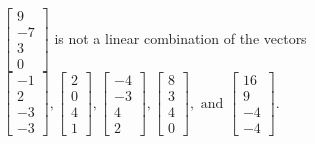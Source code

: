 \begin{exercise}
\begin{exerciseStatement}
  \end{exerciseStatement}
  \begin{exerciseAnswer}
   \(\left[\begin{array}{c}
9 \\
-7 \\
3 \\
0
\end{array}\right]\) 
  	 is not  
	a linear combination of the vectors \(\left[\begin{array}{c}
-1 \\
2 \\
-3 \\
-3
\end{array}\right] , \left[\begin{array}{c}
2 \\
0 \\
4 \\
1
\end{array}\right] , \left[\begin{array}{c}
-4 \\
-3 \\
4 \\
2
\end{array}\right] , \left[\begin{array}{c}
8 \\
3 \\
4 \\
0
\end{array}\right] , \text{ and } \left[\begin{array}{c}
16 \\
9 \\
-4 \\
-4
\end{array}\right]\).

	
  


  \end{exerciseAnswer}
\end{exercise}